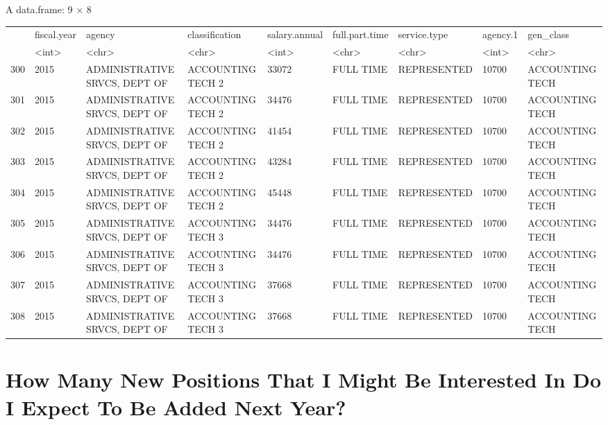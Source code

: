 \documentclass[11pt]{article}
\begin{document}
    A data.frame: 9 × 8
\begin{tabular}{r|llllllll}
  & fiscal.year & agency & classification & salary.annual & full.part.time & service.type & agency.1 & gen\_class\\
  & <int> & <chr> & <chr> & <int> & <chr> & <chr> & <int> & <chr>\\
\hline
	300 & 2015 & ADMINISTRATIVE SRVCS, DEPT OF & ACCOUNTING TECH 2 & 33072 & FULL TIME & REPRESENTED & 10700 & ACCOUNTING TECH\\
	301 & 2015 & ADMINISTRATIVE SRVCS, DEPT OF & ACCOUNTING TECH 2 & 34476 & FULL TIME & REPRESENTED & 10700 & ACCOUNTING TECH\\
	302 & 2015 & ADMINISTRATIVE SRVCS, DEPT OF & ACCOUNTING TECH 2 & 41454 & FULL TIME & REPRESENTED & 10700 & ACCOUNTING TECH\\
	303 & 2015 & ADMINISTRATIVE SRVCS, DEPT OF & ACCOUNTING TECH 2 & 43284 & FULL TIME & REPRESENTED & 10700 & ACCOUNTING TECH\\
	304 & 2015 & ADMINISTRATIVE SRVCS, DEPT OF & ACCOUNTING TECH 2 & 45448 & FULL TIME & REPRESENTED & 10700 & ACCOUNTING TECH\\
	305 & 2015 & ADMINISTRATIVE SRVCS, DEPT OF & ACCOUNTING TECH 3 & 34476 & FULL TIME & REPRESENTED & 10700 & ACCOUNTING TECH\\
	306 & 2015 & ADMINISTRATIVE SRVCS, DEPT OF & ACCOUNTING TECH 3 & 34476 & FULL TIME & REPRESENTED & 10700 & ACCOUNTING TECH\\
	307 & 2015 & ADMINISTRATIVE SRVCS, DEPT OF & ACCOUNTING TECH 3 & 37668 & FULL TIME & REPRESENTED & 10700 & ACCOUNTING TECH\\
	308 & 2015 & ADMINISTRATIVE SRVCS, DEPT OF & ACCOUNTING TECH 3 & 37668 & FULL TIME & REPRESENTED & 10700 & ACCOUNTING TECH\\
\end{tabular}


    
    \hypertarget{how-many-new-positions-that-i-might-be-interested-in-do-i-expect-to-be-added-next-year}{%
\section{How Many New Positions That I Might Be Interested In Do I
Expect To Be Added Next
Year?}\label{how-many-new-positions-that-i-might-be-interested-in-do-i-expect-to-be-added-next-year}}
\end{document}
